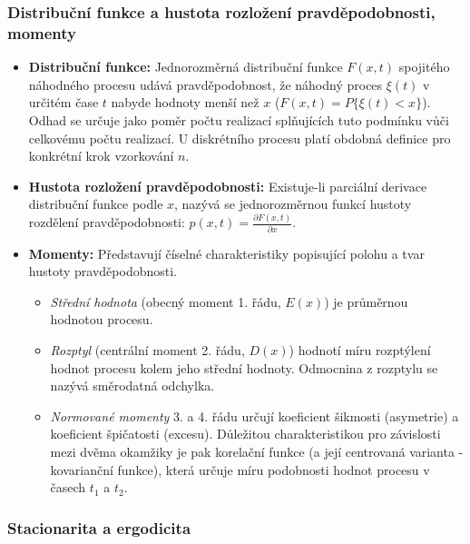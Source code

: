     \subsubsection{Distribuční funkce a hustota rozložení pravděpodobnosti, momenty}
        \begin{itemize}
            \item \textbf{Distribuční funkce:} Jednorozměrná distribuční funkce $F(x, t)$ spojitého náhodného procesu udává pravděpodobnost, že náhodný proces $\xi(t)$ v určitém čase $t$ nabyde hodnoty menší než $x$ ($F(x, t) = P\{\xi(t) < x\}$). Odhad se určuje jako poměr počtu realizací splňujících tuto podmínku vůči celkovému počtu realizací. U diskrétního procesu platí obdobná definice pro konkrétní krok vzorkování $n$.
            \item \textbf{Hustota rozložení pravděpodobnosti:} Existuje-li parciální derivace distribuční funkce podle $x$, nazývá se jednorozměrnou funkcí hustoty rozdělení pravděpodobnosti: $p(x, t) = \frac{\partial F(x, t)}{\partial x}$.
            \item \textbf{Momenty:} Představují číselné charakteristiky popisující polohu a tvar hustoty pravděpodobnosti.
            \begin{itemize}
                \item \textit{Střední hodnota} (obecný moment 1. řádu, $E(x)$) je průměrnou hodnotou procesu.
                \item \textit{Rozptyl} (centrální moment 2. řádu, $D(x)$) hodnotí míru rozptýlení hodnot procesu kolem jeho střední hodnoty. Odmocnina z rozptylu se nazývá směrodatná odchylka.
                \item \textit{Normované momenty} 3. a 4. řádu určují koeficient šikmosti (asymetrie) a koeficient špičatosti (excesu). Důležitou charakteristikou pro závislosti mezi dvěma okamžiky je pak korelační funkce (a její centrovaná varianta - kovarianční funkce), která určuje míru podobnosti hodnot procesu v časech $t_1$ a $t_2$.
            \end{itemize}
    \end{itemize}
    \subsubsection{Stacionarita a ergodicita}

